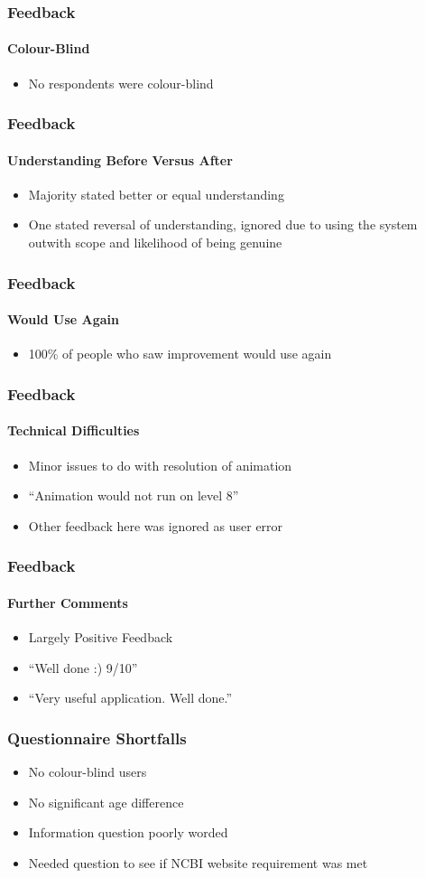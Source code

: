 \begin{frame}
  \frametitle{Feedback}
  \framesubtitle{Colour-Blind}
  \begin{itemize}
    \item{No respondents were colour-blind}
  \end{itemize}
\end{frame}

\begin{frame}
  \frametitle{Feedback}
  \framesubtitle{Understanding Before Versus After}
  \begin{itemize}
    \item{Majority stated better or equal understanding}
    \item{One stated reversal of understanding, ignored due to using
        the system outwith scope and likelihood of being genuine}
  \end{itemize}
\end{frame}

\begin{frame}
  \frametitle{Feedback}
  \framesubtitle{Would Use Again}
  \begin{itemize}
    \item{100\% of people who saw improvement would use again}
  \end{itemize}
\end{frame}

\begin{frame}
  \frametitle{Feedback}
  \framesubtitle{Technical Difficulties}
  \begin{itemize}
    \item{Minor issues to do with resolution of animation}
    \item{``Animation would not run on level 8''}
    \item{Other feedback here was ignored as user error}
  \end{itemize}
\end{frame}

\begin{frame}
  \frametitle{Feedback}
  \framesubtitle{Further Comments}
  \begin{itemize}
  \item{Largely Positive Feedback}
  \item{``Well done :) 9/10''}
  \item{``Very useful application. Well done.''}
  \end{itemize}
\end{frame}

\begin{frame}
  \frametitle{Questionnaire Shortfalls}
  \begin{itemize}
  \item{No colour-blind users}
  \item{No significant age difference}
  \item{Information question poorly worded}
  \item{Needed question to see if NCBI website requirement was met}
  \end{itemize}
\end{frame}
